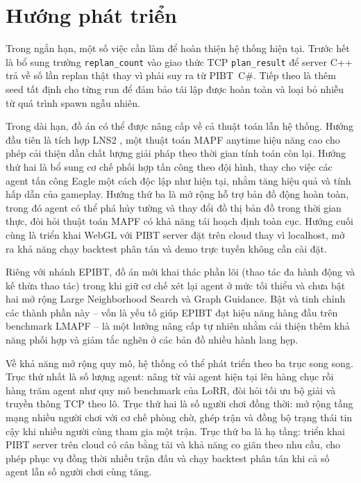 \documentclass[../DoAn.tex]{subfiles}
\begin{document}
\section{Hướng phát triển}

Trong ngắn hạn, một số việc cần làm để hoàn thiện hệ thống hiện tại. Trước hết là bổ sung
trường \texttt{replan\_count} vào giao thức TCP \texttt{plan\_result} để server C++ trả về
số lần replan thật thay vì phải suy ra từ PIBT~C\#. Tiếp theo là thêm seed tất định cho từng
run để đảm bảo tái lập được hoàn toàn và loại bỏ nhiễu từ quá trình spawn ngẫu nhiên.

Trong dài hạn, đồ án có thể được nâng cấp về cả thuật toán lẫn hệ thống. Hướng đầu tiên
là tích hợp LNS2 \cite{li2021anytime}, một thuật toán MAPF anytime hiệu năng cao cho phép
cải thiện dần chất lượng giải pháp theo thời gian tính toán còn lại. Hướng thứ hai là bổ
sung cơ chế phối hợp tấn công theo đội hình, thay cho việc các agent tấn công Eagle một
cách độc lập như hiện tại, nhằm tăng hiệu quả và tính hấp dẫn của gameplay. Hướng thứ ba
là mở rộng hỗ trợ bản đồ động hoàn toàn, trong đó agent có thể phá hủy tường và thay đổi
đồ thị bản đồ trong thời gian thực, đòi hỏi thuật toán MAPF có khả năng tái hoạch định
toàn cục. Hướng cuối cùng là triển khai WebGL với PIBT server đặt trên cloud thay vì
localhost, mở ra khả năng chạy backtest phân tán và demo trực tuyến không cần cài đặt.

Riêng với nhánh EPIBT, đồ án mới khai thác phần lõi (thao tác đa hành động và kế thừa thao tác)
trong khi giữ cơ chế xét lại agent ở mức tối thiểu và chưa bật hai mở rộng Large Neighborhood
Search và Graph Guidance. Bật và tinh chỉnh các thành phần này -- vốn là yếu tố giúp EPIBT đạt
hiệu năng hàng đầu trên benchmark LMAPF -- là một hướng nâng cấp tự nhiên nhằm cải thiện thêm khả
năng phối hợp và giảm tắc nghẽn ở các bản đồ nhiều hành lang hẹp.

Về khả năng mở rộng quy mô, hệ thống có thể phát triển theo ba trục song song. Trục thứ
nhất là số lượng agent: nâng từ vài agent hiện tại lên hàng chục rồi hàng trăm agent như
quy mô benchmark của LoRR, đòi hỏi tối ưu bộ giải và truyền thông TCP theo lô. Trục thứ
hai là số người chơi đồng thời: mở rộng tầng mạng nhiều người chơi với cơ chế phòng chờ,
ghép trận và đồng bộ trạng thái tin cậy khi nhiều người cùng tham gia một trận. Trục thứ
ba là hạ tầng: triển khai PIBT server trên cloud có cân bằng tải và khả năng co giãn theo
nhu cầu, cho phép phục vụ đồng thời nhiều trận đấu và chạy backtest phân tán khi cả số
agent lẫn số người chơi cùng tăng.
\end{document}
